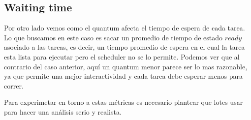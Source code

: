 \subsection{Waiting time}

Por otro lado vemos como el quantum afecta el tiempo de espera de cada tarea. Lo que buscamos en este caso es sacar un promedio de tiempo de estado $ready$ asociado a las tareas, es decir, un tiempo promedio de espera en el cual la tarea esta lista para ejecutar pero el scheduler no se lo permite.
Podemos ver que al contrario del caso anterior, aquí un quantum menor parece ser lo mas razonable, ya que permite una mejor interactividad y cada tarea debe esperar menos para correr.

Para experimetar en torno a estas métricas es necesario plantear que lotes usar para hacer una análisis serio y realista.

